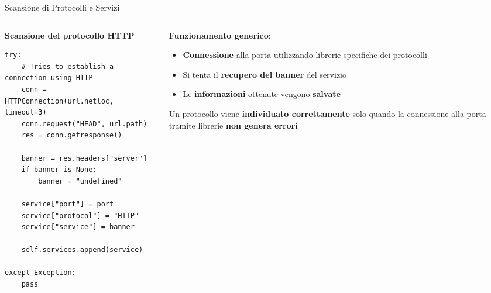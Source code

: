 
\begin{frame}[fragile]{Scansione di Protocolli e Servizi}
\begin{columns}
\begin{column}{0.5\textwidth}
\centering
\textbf{Scansione del protocollo HTTP}
\begin{lstlisting}[style=statalepython, basicstyle=\tiny]
try:
    # Tries to establish a connection using HTTP
    conn = HTTPConnection(url.netloc, timeout=3)
    conn.request("HEAD", url.path)
    res = conn.getresponse()

    banner = res.headers["server"]
    if banner is None:
        banner = "undefined"

    service["port"] = port
    service["protocol"] = "HTTP"
    service["service"] = banner

    self.services.append(service)

except Exception:
    pass
\end{lstlisting}
\end{column}
\begin{column}{0.5\textwidth}
\textbf{Funzionamento generico}:
\begin{itemize}
    \item \textbf{Connessione} alla porta utilizzando librerie specifiche dei protocolli
    \item Si tenta il \textbf{recupero del banner} del servizio
    \item Le \textbf{informazioni} ottenute vengono \textbf{salvate}
\end{itemize}
Un protocollo viene \textbf{individuato correttamente} solo quando la connessione alla porta tramite librerie \textbf{non genera errori}
\end{column}
\end{columns}
\end{frame}


